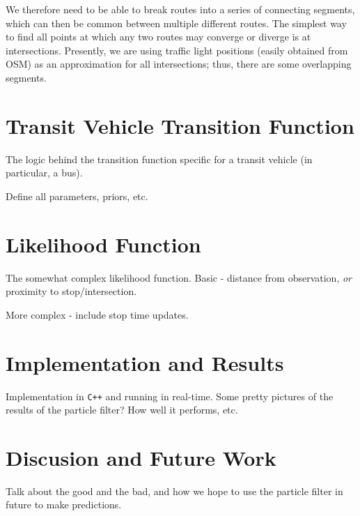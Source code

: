 \documentclass[draft,a4paper,onecolumn]{IEEEtran}\usepackage[]{graphicx}\usepackage[]{color}
\begin{document}
We therefore need to be able to break routes into a series
of connecting segments, 
which can then be common between multiple different routes.
The simplest way to find all points at which any two routes 
may converge or diverge is at intersections.
Presently, we are using traffic light positions 
(easily obtained from OSM)
as an approximation for all intersections;
thus, there are some overlapping segments.



\section{Transit Vehicle Transition Function}
\label{sec:transition}

The logic behind the transition function specific for a transit vehicle
(in particular, a bus).

Define all parameters, priors, etc.



\section{Likelihood Function}
\label{sec:likelihood}

The somewhat complex likelihood function.
Basic - distance from observation, \emph{or} proximity to stop/intersection.

More complex - include stop time updates.



\section{Implementation and Results}
\label{sec:results}

Implementation in \texttt{C++} and running in real-time.
Some pretty pictures of the results of the particle filter? 
How well it performs, etc.



\section{Discusion and Future Work}
\label{sec:discussion}

Talk about the good and the bad, and how we hope to use the particle filter in future to make predictions.





\end{document}
